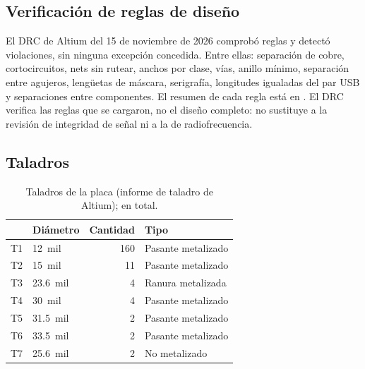 \subsection{Verificación de reglas de diseño}

El DRC de Altium del 15 de noviembre de 2026 comprobó \bDrcRules{} reglas y detectó \bDrcViolations{}
violaciones, sin ninguna excepción concedida. Entre ellas: separación de cobre, cortocircuitos, nets sin
rutear, anchos por clase, vías, anillo mínimo, separación entre agujeros, lengüetas de máscara, serigrafía,
longitudes igualadas del par USB y separaciones entre componentes. El resumen de cada regla está en
. El DRC verifica las reglas que se cargaron, no el diseño completo: no
sustituye a la revisión de integridad de señal ni a la de radiofrecuencia.

\subsection{Taladros}

\begin{table}[H]
\centering
\small
\begin{tabular}{|l l r l|}
\hline
\tablehead{\textbf{Herramienta} & \textbf{Diámetro} & \textbf{Cantidad} & \textbf{Tipo}} \\ \hline
T1 & 12~mil & 160 & Pasante metalizado \\ \hline
T2 & 15~mil & 11 & Pasante metalizado \\ \hline
T3 & 23.6~mil & 4 & Ranura metalizada \\ \hline
T4 & 30~mil & 4 & Pasante metalizado \\ \hline
T5 & 31.5~mil & 2 & Pasante metalizado \\ \hline
T6 & 33.5~mil & 2 & Pasante metalizado \\ \hline
T7 & 25.6~mil & 2 & No metalizado \\ \hline
\end{tabular}
\caption{Taladros de la placa (informe de taladro de Altium); \bHoles{} en total.}
\end{table}
